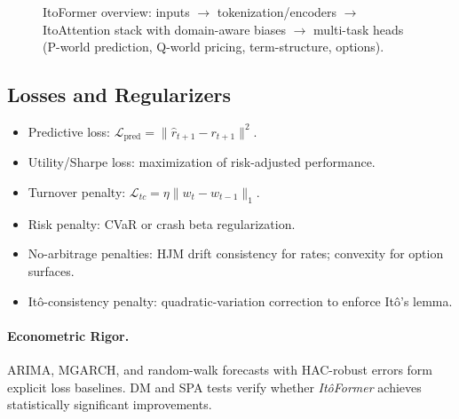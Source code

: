 \documentclass[10pt,twocolumn]{article}
\begin{document}
\begin{figure}[t]
{
}
\caption{ItoFormer overview: inputs $\to$ tokenization/encoders $\to$ ItoAttention stack with domain-aware biases $\to$ multi-task heads (P-world prediction, Q-world pricing, term-structure, options).}
\label{fig:itoformer-overview}
\end{figure}

\subsection{Losses and Regularizers}

\begin{itemize}
    \item Predictive loss: 
    \(\mathcal L_{\text{pred}} = \|\hat r_{t+1} - r_{t+1}\|^2\).  
    \item Utility/Sharpe loss: maximization of risk-adjusted performance.  
    \item Turnover penalty: 
    \(\mathcal L_{tc} = \eta \| w_t - w_{t-1}\|_1\).  
    \item Risk penalty: CVaR or crash beta regularization.  
    \item No-arbitrage penalties: HJM drift consistency for rates; convexity for option surfaces.  
    \item It\^o-consistency penalty: quadratic-variation correction to enforce It\^o's lemma.  
\end{itemize}

\paragraph{Econometric Rigor.}
ARIMA, MGARCH, and random-walk forecasts with HAC-robust errors form explicit loss baselines. DM and SPA tests verify whether \emph{It\^oFormer} achieves statistically significant improvements.
\end{document}
